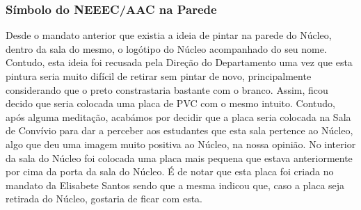 
\subsubsection{Símbolo do NEEEC/AAC na Parede}

Desde o mandato anterior que existia a ideia de pintar na parede do Núcleo, dentro da sala do mesmo, o logótipo do Núcleo acompanhado do seu nome. Contudo, esta ideia foi recusada pela Direção do Departamento uma vez que esta pintura seria muito difícil de retirar sem pintar de novo, principalmente considerando que o preto constrastaria bastante com o branco. Assim, ficou decido que seria colocada uma placa de PVC com o mesmo intuito. Contudo, após alguma meditação, acabámos por decidir que a placa seria colocada na Sala de Convívio para dar a perceber aos estudantes que esta sala pertence ao Núcleo, algo que deu uma imagem muito positiva ao Núcleo, na nossa opinião. No interior da sala do Núcleo foi colocada uma placa mais pequena que estava anteriormente por cima da porta da sala do Núcleo. É de notar que esta placa foi criada no mandato da Elisabete Santos sendo que a mesma indicou que, caso a placa seja retirada do Núcleo, gostaria de ficar com esta.